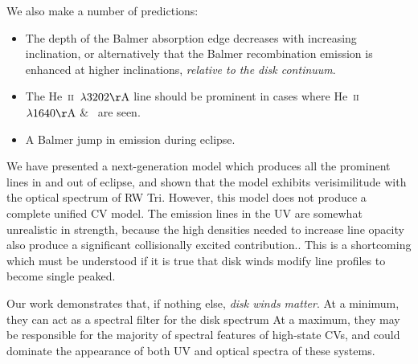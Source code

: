 \documentclass[preprint, a4paper, 11pt]{aastex}
\begin{document}
\noindent We also make a number of predictions:

\begin{itemize}
	\item The depth of the Balmer absorption edge decreases with increasing inclination,
or alternatively that the Balmer recombination emission
is enhanced at higher inclinations, {\sl relative to the disk continuum}.
	\item The He~\textsc{ii}~$\lambda3202{\rm \AA}$ line should be
prominent in cases where He~\textsc{ii}~$\lambda1640{\rm \AA}$ \& 
\heiiopt\ are seen. 
	\item A Balmer jump in emission during eclipse.
\end{itemize}

\smallskip
We have presented a next-generation model
which produces all the prominent lines in and out of eclipse, and
shown that the model exhibits verisimilitude with the optical spectrum of RW Tri.
However, this model does not produce a complete unified CV model. 
The emission lines in the UV are somewhat unrealistic in strength,
because the high densities needed to increase line opacity also produce
a significant collisionally excited contribution..
This is a shortcoming which must be understood if it is true that
disk winds modify line profiles to become single peaked.

Our work demonstrates that, if nothing else,
{\sl disk winds matter}. At a minimum,
they can act as a spectral filter
for the disk spectrum
At a maximum, they may be responsible
for the majority of spectral features of high-state CVs,
and could dominate the appearance of both UV and optical
spectra of these systems.







\end{document}
